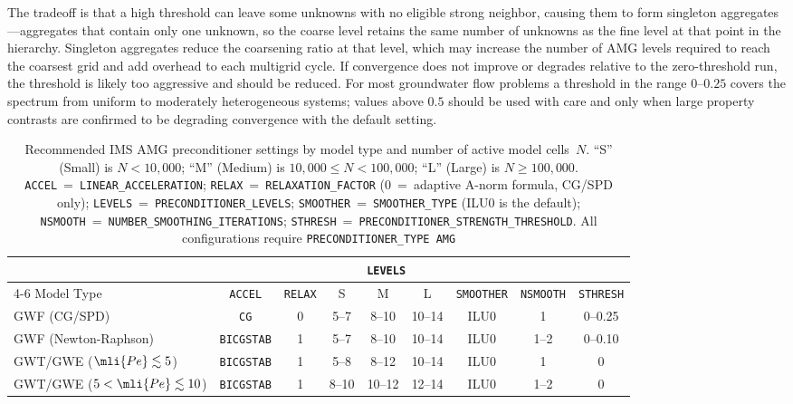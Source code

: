 The tradeoff is that a high threshold can leave some unknowns with no eligible strong neighbor, causing them to form singleton aggregates---aggregates that contain only one unknown, so the coarse level retains the same number of unknowns as the fine level at that point in the hierarchy. Singleton aggregates reduce the coarsening ratio at that level, which may increase the number of AMG levels required to reach the coarsest grid and add overhead to each multigrid cycle. If convergence does not improve or degrades relative to the zero-threshold run, the threshold is likely too aggressive and should be reduced. For most \mf groundwater flow problems a threshold in the range $0$--$0.25$ covers the spectrum from uniform to moderately heterogeneous systems; values above $0.5$ should be used with care and only when large property contrasts are confirmed to be degrading convergence with the default setting.

\begin{table}[!ht]
  \small
  \begin{center}
  \caption[Recommended IMS AMG preconditioner settings by model type and problem size]{%
    Recommended IMS AMG preconditioner settings by model type and number of active model cells~$N$.
    ``S'' (Small) is $N < 10{,}000$; ``M'' (Medium) is $10{,}000 \le N < 100{,}000$; ``L'' (Large) is $N \ge 100{,}000$.
    \texttt{ACCEL}~=~\texttt{LINEAR\_ACCELERATION};
    \texttt{RELAX}~=~\texttt{RELAXATION\_FACTOR} (0~=~adaptive A-norm formula, CG/SPD only);
    \texttt{LEVELS}~=~\texttt{PRECONDITIONER\_LEVELS};
    \texttt{SMOOTHER}~=~\texttt{SMOOTHER\_TYPE} (ILU0 is the default);
    \texttt{NSMOOTH}~=~\texttt{NUMBER\_SMOOTHING\_ITERATIONS};
    \texttt{STHRESH}~=~\texttt{PRECONDITIONER\_STRENGTH\_THRESHOLD}.
    All configurations require \texttt{PRECONDITIONER\_TYPE AMG}}
  \label{tab:amg_settings}
  \begin{tabular}{p{3.4cm}cccccccc}
    \toprule
    & & & \multicolumn{3}{c}{\texttt{LEVELS}} & & & \\
    \cmidrule(lr){4-6}
    Model Type & \texttt{ACCEL} & \texttt{RELAX} & S & M & L & \texttt{SMOOTHER} & \texttt{NSMOOTH} & \texttt{STHRESH} \\
    \midrule
    GWF (CG/SPD) &
      \texttt{CG} & 0 & 5--7 & 8--10 & 10--14 & ILU0 & 1 & 0--0.25 \\[4pt]
    GWF (Newton-Raphson) &
      \texttt{BICGSTAB} & 1 & 5--7 & 8--10 & 10--14 & ILU0 & 1--2 & 0--0.10 \\[4pt]
    GWT/GWE ($\mli{Pe} \lesssim 5$) &
      \texttt{BICGSTAB} & 1 & 5--8 & 8--12 & 10--14 & ILU0 & 1 & 0 \\[4pt]
    GWT/GWE ($5 < \mli{Pe} \lesssim 10$) &
      \texttt{BICGSTAB} & 1 & 8--10 & 10--12 & 12--14 & ILU0 & 1--2 & 0 \\
    \bottomrule
  \end{tabular}
  \end{center}
\end{table}
